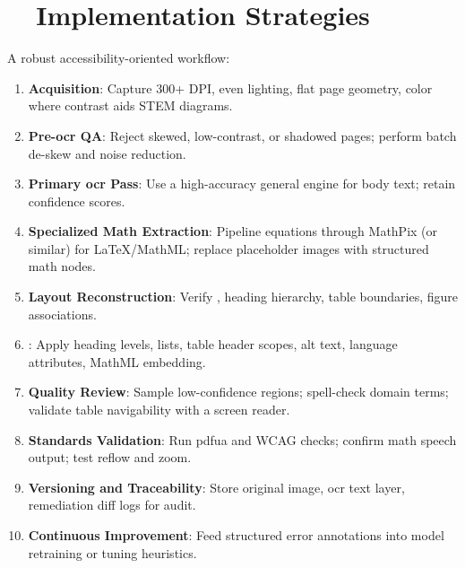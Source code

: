 \section{~~Implementation Strategies}
\label{sec:ocr-implementation}
A robust accessibility-oriented workflow:
\begin{enumerate}
	\item \textbf{Acquisition}: Capture 300+ DPI, even lighting, flat page geometry, color where contrast aids STEM diagrams.
	\item \textbf{Pre-\gls{ocr} QA}: Reject skewed, low-contrast, or shadowed pages; perform batch de-skew and noise reduction.
	\item \textbf{Primary \gls{ocr} Pass}: Use a high-accuracy general engine for body text; retain confidence scores.
	\item \textbf{Specialized Math Extraction}: Pipeline equations through MathPix (or similar) for LaTeX/MathML; replace placeholder images with structured math nodes.
	\item \textbf{Layout Reconstruction}: Verify , heading hierarchy, table boundaries, figure associations.
	\item \textbf{}: Apply heading levels, lists, table header scopes, alt text, language attributes, MathML embedding.
	\item \textbf{Quality Review}: Sample low-confidence regions; spell-check domain terms; validate table navigability with a screen reader.
	\item \textbf{Standards Validation}: Run \gls{pdfua} and WCAG checks; confirm math speech output; test reflow and zoom.
	\item \textbf{Versioning and Traceability}: Store original image, \gls{ocr} text layer, remediation diff logs for audit.
	\item \textbf{Continuous Improvement}: Feed structured error annotations into model retraining or tuning heuristics.
\end{enumerate}


